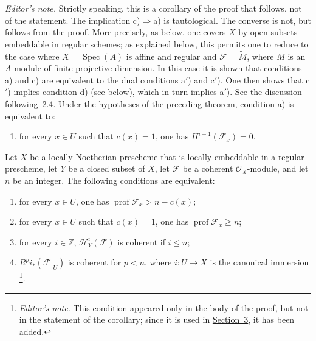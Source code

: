 \documentclass[11pt,a4paper,oneside]{book}
\providecommand{\markedfootnote}[2]{%
  \begingroup\renewcommand{\thefootnote}{#1}\footnote{#2}\endgroup}
\providecommand{\cF}{\mathcal F}
\providecommand{\prof}{\operatorname{prof}}
\theoremstyle{plain}
\theoremstyle{definition}
\theoremstyle{remark}
\begin{document}
\setcounter{section}{2}
\setcounter{sourcecorollary}{1}
\begin{sourcecorollary}{\textit{Editor's note.} Strictly speaking, this is a
corollary of the proof that follows, not of the statement. The implication
\textup{c)}$\Rightarrow$\textup{a)} is tautological. The converse is not, but
follows from the proof. More precisely, as below, one covers $X$ by open
subsets embeddable in regular schemes; as explained below, this permits one to
reduce to the case where $X=\operatorname{Spec}(A)$ is affine and regular and
$\cF=\widetilde M$, where $M$ is an $A$-module of finite projective dimension.
In this case it is shown that conditions \textup{a)} and \textup{c)} are
equivalent to the dual conditions \textup{a$'$)} and \textup{c$'$)}. One then
shows that \textup{c$'$)} implies condition \textup{d)} (see below), which in
turn implies \textup{a$'$)}. See the discussion following~\hyperref[VIII.2.4]{2.4}.}\label{VIII.2.2}
Under the hypotheses of the preceding theorem, condition \textup{a)} is
equivalent to:
\begin{enumerate}[label=\textup{\alph*)},start=3,leftmargin=2.2em]
\item for every $x\in U$ such that $c(x)=1$, one has
  $H^{i-1}(\cF_x)=0$.
\end{enumerate}
\end{sourcecorollary}


\setcounter{section}{2}
\setcounter{sourcecorollary}{2}
\begin{sourcecorollary}\label{VIII.2.3}
Let $X$ be a locally Noetherian prescheme that is locally embeddable in a
regular prescheme, let $Y$ be a closed subset of $X$, let $\cF$ be a coherent
$\mathcal O_X$-module, and let $n$ be an integer. The following conditions are
equivalent:
\begin{enumerate}[label=\textup{(\roman*)},leftmargin=2.8em]
\item for every $x\in U$, one has
  $\prof \cF_x>n-c(x)$;
\item for every $x\in U$ such that $c(x)=1$, one has
  $\prof \cF_x\geq n$;
\item for every $i\in\mathbb Z$, $\mathcal H^i_Y(\cF)$ is coherent if
  $i\leq n$;
\item $R^p i_*(\cF|_U)$ is coherent for $p<n$, where $i\colon U\to X$ is the canonical immersion%
  \markedfootnote{(4)}{\textit{Editor's note.} This condition appeared only
  in the body of the proof, but not in the statement of the corollary; since
  it is used in \hyperref[VIII.3]{Section~3}, it has been added.}.
\end{enumerate}
\end{sourcecorollary}
\end{document}

